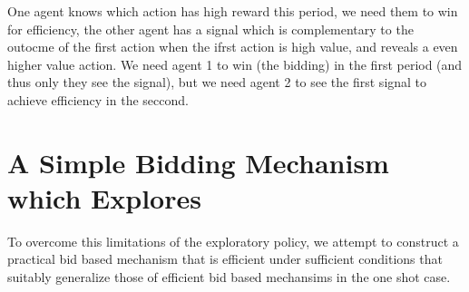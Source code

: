 
\begin{eg}
One agent knows which action has high reward this period, we need them to win for efficiency, the other agent has a signal which is complementary to the outocme of the first action when the ifrst action is high value, and reveals a even higher value action. We need agent 1 to win (the bidding) in the first period (and thus only they see the signal), but we need agent 2 to see the first signal to achieve efficiency in the seccond.
\end{eg}




\section{A Simple Bidding Mechanism which Explores}

To overcome this limitations of the exploratory policy, we attempt to construct a practical bid based mechanism that is efficient under sufficient conditions that suitably generalize those of efficient bid based mechansims in the one shot case. 

